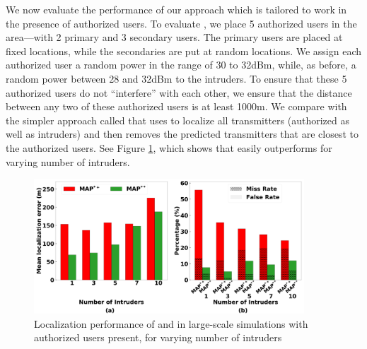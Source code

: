   We now evaluate
the performance of our \ouralgoss approach which is tailored to work
in the presence of authorized users. To evaluate \ouralgoss, we place
5 authorized users in the area---with 2 primary and 3 secondary users.
The primary users are placed at fixed locations, while the secondaries
are put at random locations. We assign each authorized user a random
power in the range of 30 to 32dBm, while, as before, a random power
between 28 and 32dBm to the intruders. To ensure that these 5
authorized users do not ``interfere'' with each other, we ensure that
the distance between any two of these authorized users is at least
1000m.
We compare \ouralgoss with the simpler approach called \ouralgos that
uses \ouralgo to localize all transmitters (authorized as well as
intruders) and then removes the predicted transmitters that are
closest to the authorized users.
See Figure \ref{fig:shared-spectrum}, which shows that \ouralgoss easily
outperforms \ouralgos for varying number of intruders. 

\begin{figure}[ht]
	\centering
	\includegraphics[width=0.9\textwidth]{chapters/ipsn/figures/splat-vary-numauthorized.png}
	\caption{Localization performance of \ouralgos and \ouralgoss in large-scale simulations with authorized users present, for varying number of intruders}
	\label{fig:shared-spectrum}
\end{figure}
